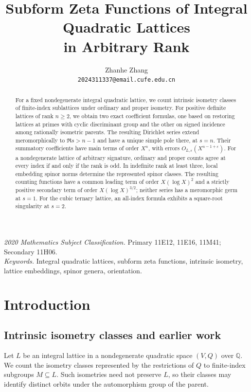 \documentclass[11pt]{article}
\title{Subform Zeta Functions of Integral Quadratic Lattices\\in Arbitrary Rank}
\author{Zhanhe Zhang\\[0.25em]\normalsize\texttt{2024311337@email.cufe.edu.cn}}
\date{}
\theoremstyle{remark}\newtheorem{remark}[theorem]{Remark}
\begin{document}
\maketitle
\begin{abstract}
For a fixed nondegenerate integral quadratic lattice, we count
intrinsic isometry classes of finite-index sublattices under ordinary
and proper isometry. For positive definite lattices of rank $n\ge2$,
we obtain two exact coefficient formulas, one based on restoring
lattices at primes with cyclic discriminant group and the other on
signed incidence among rationally isometric parents. The resulting Dirichlet series extend meromorphically to $\Re s>n-1$
and have a unique simple pole there, at $s=n$. Their summatory coefficients
have main terms of order $X^n$, with errors
$O_{L,\varepsilon}(X^{n-1+\varepsilon})$.
For a nondegenerate lattice of arbitrary signature, ordinary and proper
counts agree at every index if and only if the rank is odd. In indefinite
rank at least three, local embedding spinor norms determine the represented
spinor classes. The resulting counting functions have
a common leading term of order $X(\log X)^2$ and a strictly positive
secondary term of order $X(\log X)^{3/2}$; neither series has a
meromorphic germ at $s=1$. For the cubic ternary lattice, an all-index formula exhibits a
square-root singularity at $s=2$.
\end{abstract}
\noindent\textit{2020 Mathematics Subject Classification.} Primary 11E12, 11E16, 11M41; Secondary 11H06.\\
\noindent\textit{Keywords.} Integral quadratic lattices, subform zeta functions, intrinsic isometry, lattice embeddings, spinor genera, orientation.

\section{Introduction}

\subsection{Intrinsic isometry classes and earlier work}

Let $L$ be an integral lattice in a nondegenerate quadratic space $(V,Q)$
over $\mathbb Q$. We count the isometry classes represented by the
restrictions of $Q$ to finite-index subgroups $M\subseteq L$. Such
isometries need not preserve $L$, so their classes may identify distinct
orbits under the automorphism group of the parent.
\end{document}
